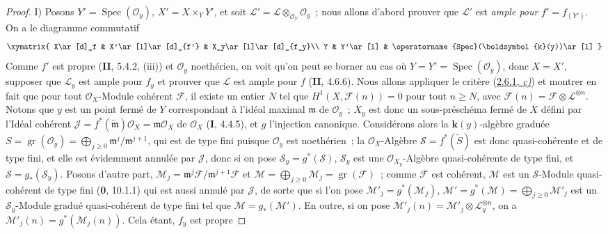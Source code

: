 \begin{proof}
\noindent I) Posons
$Y'=\operatorname{Spec}(\mathcal O_y)$, $X'=X\times_YY'$, et soit
$\mathcal L'=\mathcal L\otimes_{\mathcal O_Y}\mathcal O_y$~;
nous allons d'abord prouver que $\mathcal L'$ est \emph{ample pour}
$f'=f_{(Y')}$. On a le diagramme commutatif
\[
\xymatrix{
X\ar[d]_f & X'\ar[l]\ar[d]_{f'} & X_y\ar[l]\ar[d]_{f_y}\\
Y & Y'\ar[l] & \operatorname{Spec}(\boldsymbol{k}(y))\ar[l]
}
\]
Comme $f'$ est propre (\textbf{II}, 5.4.2, (iii)) et $\mathcal O_y$ noethérien, on
voit qu'on peut se borner au cas où
$Y=Y'=\operatorname{Spec}(\mathcal O_y)$, donc $X=X'$, supposer que
$\mathcal L_y$ est ample pour $f_y$ et prouver que $\mathcal L$ est ample
pour $f$ (\textbf{II}, 4.6.6). Nous allons appliquer le critère
(\hyperref[III.2.6.1-fr]{2.6.1, \emph{c)}}) et montrer en fait que pour tout
$\mathcal O_X$-Module cohérent $\mathcal F$, il existe un entier $N$ tel que
$H^1(X,\mathcal F(n))=0$ pour tout $n\geq N$, avec
$\mathcal F(n)=\mathcal F\otimes\mathcal L^{\otimes n}$.
Notons que $y$ est un point fermé de $Y$ correspondant à l'idéal maximal
$\mathfrak m$ de $\mathcal O_y$~; $X_y$ est donc un sous-préschéma fermé de
$X$ défini par l'Idéal cohérent
$\mathcal J=f^*(\widetilde{\mathfrak m})\mathcal O_X=
\mathfrak m\mathcal O_X$ de $\mathcal O_X$ (\textbf{I}, 4.4.5), et $g$ l'injection
canonique. Considérons alors la $\boldsymbol{k}(y)$-algèbre graduée
$S=\operatorname{gr}(\mathcal O_y)
=\bigoplus_{j\geq0}\mathfrak m^j/\mathfrak m^{j+1}$,
qui est de type fini puisque $\mathcal O_y$ est noethérien~; la
$\mathcal O_X$-Algèbre $\mathcal S=f^*(\widetilde S)$ est donc
quasi-cohérente et de type fini, et elle est évidemment annulée par
$\mathcal J$, donc si on pose $\mathcal S_y=g^*(\mathcal S)$,
$\mathcal S_y$ est une $\mathcal O_{X_y}$-Algèbre quasi-cohérente de type
fini, et $\mathcal S=g_*(\mathcal S_y)$. Posons d'autre part,
$\mathcal M_j=\mathfrak m^j\mathcal F/\mathfrak m^{j+1}\mathcal F$ et
$\mathcal M=\bigoplus_{j\geq0}\mathcal M_j
=\operatorname{gr}(\mathcal F)$~;
comme $\mathcal F$ est cohérent, $\mathcal M$ est un $\mathcal S$-Module
quasi-cohérent de type fini (\textbf{0}, 10.1.1) qui est aussi annulé par
$\mathcal J$, de sorte que si l'on pose
$\mathcal M'_j=g^*(\mathcal M_j)$, $\mathcal M'=g^*(\mathcal M)=\bigoplus_{j\geq0}\mathcal M'_j$
est un $\mathcal S_y$-Module gradué quasi-cohérent de type
fini tel que $\mathcal M=g_*(\mathcal M')$. En outre, si on pose
$\mathcal M'_j(n)=\mathcal M'_j\otimes\mathcal L_y^{\otimes n}$, on a
$\mathcal M'_j(n)=g^*(\mathcal M_j(n))$. Cela étant, $f_y$ est propre

\end{proof}
